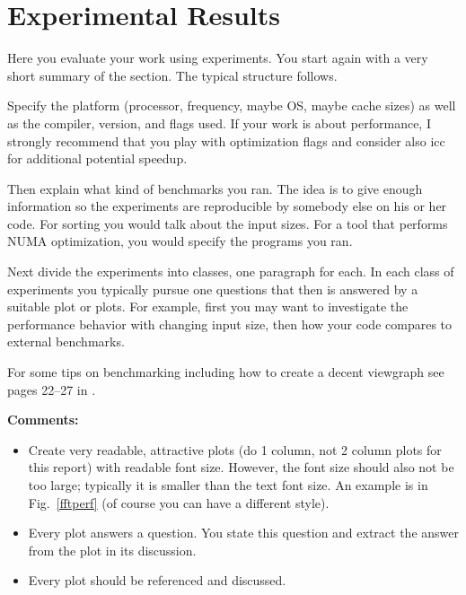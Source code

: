 \section{Experimental Results}
  \label{sec:exp}

  Here you evaluate your work using experiments. You start again with a
  very short summary of the section. The typical structure follows.

   Specify the platform (processor, frequency, maybe OS, maybe cache sizes)
  as well as the compiler, version, and flags used. If your work is about performance, 
  I strongly recommend that you play with optimization flags and consider also icc for additional potential speedup.

  Then explain what kind of benchmarks you ran. The idea is to give enough information so the experiments are reproducible by somebody else on his or her code.
  For sorting you would talk about the input sizes. For a tool that performs NUMA optimization, you would specify the programs you ran.

  Next divide the experiments into classes, one paragraph for each. In each class of experiments you typically pursue one questions that then is answered by a suitable plot or plots. For example, first you may want to investigate the performance behavior with changing input size, then how your code compares to external benchmarks.

  For some tips on benchmarking including how to create a decent viewgraph see pages 22--27 in \cite{Pueschel:10}.

  {\bf Comments:}
  \begin{itemize}
    \item Create very readable, attractive plots (do 1 column, not 2 column plots
      for this report) with readable font size. However, the font size should also not be too large; typically it is smaller than the text font size.
      An example is in Fig.~\ref{fftperf} (of course you can have a different style).
    \item Every plot answers a question. You state this question and extract the
      answer from the plot in its discussion.
    \item Every plot should be referenced and discussed.
  \end{itemize}


